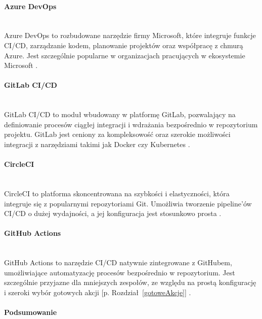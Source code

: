 \documentclass{article}
\newcommand{\chapref}[1]{[p. Rozdział~\ref{#1}]}
\begin{document}
\paragraph{Azure DevOps}\mbox{} \\

Azure DevOps to rozbudowane narzędzie firmy Microsoft, które integruje funkcje CI/CD, zarządzanie kodem, planowanie projektów oraz współpracę z chmurą Azure. Jest szczególnie popularne w organizacjach pracujących w ekosystemie Microsoft \cite{AzureDevOpsGitHubActionsComparison}.

\paragraph{GitLab CI/CD}\mbox{} \\

GitLab CI/CD to moduł wbudowany w platformę GitLab, pozwalający na definiowanie procesów ciągłej integracji i wdrażania bezpośrednio w repozytorium projektu. GitLab jest ceniony za kompleksowość oraz szerokie możliwości integracji z narzędziami takimi jak Docker czy Kubernetes \cite{GitLabAzureDevOpsComparison}.

\paragraph{CircleCI}\mbox{} \\

CircleCI to platforma skoncentrowana na szybkości i elastyczności, która integruje się z popularnymi repozytoriami Git. Umożliwia tworzenie pipeline'ów CI/CD o dużej wydajności, a jej konfiguracja jest stosunkowo prosta \cite{CircleCIGitHubActionsGitLab}.

\paragraph{GitHub Actions}\mbox{} \\

GitHub Actions to narzędzie CI/CD natywnie zintegrowane z GitHubem, umożliwiające automatyzację procesów bezpośrednio w repozytorium. Jest szczególnie przyjazne dla mniejszych zespołów, ze względu na prostą konfigurację i szeroki wybór gotowych akcji \chapref{gotoweAkcje} \cite{GitHubActionsImporter}.

\paragraph{Podsumowanie}\mbox{} \\
\end{document}
